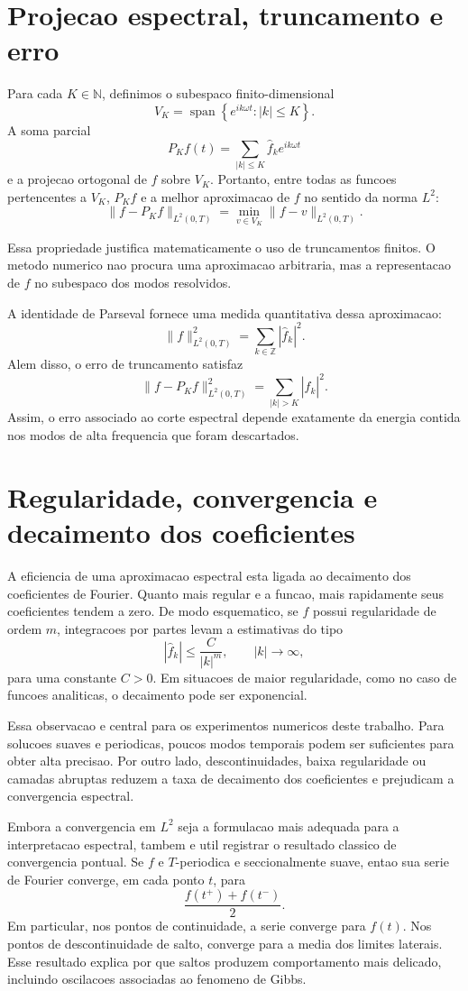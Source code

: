 \section{Projecao espectral, truncamento e erro}

Para cada \(K\in\mathbb{N}\), definimos o subespaco finito-dimensional
\[
V_K=
\operatorname{span}
\left\{
e^{ik\omega t}: |k|\le K
\right\}.
\]
A soma parcial
\[
P_Kf(t)=
\sum_{|k|\le K}\widehat f_k e^{ik\omega t}
\]
e a projecao ortogonal de \(f\) sobre \(V_K\). Portanto, entre todas as funcoes
pertencentes a \(V_K\), \(P_Kf\) e a melhor aproximacao de \(f\) no sentido da
norma \(L^2\):
\[
\|f-P_Kf\|_{L^2(0,T)}
=
\min_{v\in V_K}\|f-v\|_{L^2(0,T)}.
\]

Essa propriedade justifica matematicamente o uso de truncamentos finitos. O
metodo numerico nao procura uma aproximacao arbitraria, mas a representacao de
\(f\) no subespaco dos modos resolvidos.

A identidade de Parseval fornece uma medida quantitativa dessa aproximacao:
\[
\|f\|_{L^2(0,T)}^2
=
\sum_{k\in\mathbb{Z}}|\widehat f_k|^2.
\]
Alem disso, o erro de truncamento satisfaz
\[
\|f-P_Kf\|_{L^2(0,T)}^2
=
\sum_{|k|>K}|\widehat f_k|^2.
\]
Assim, o erro associado ao corte espectral depende exatamente da energia
contida nos modos de alta frequencia que foram descartados.

\section{Regularidade, convergencia e decaimento dos coeficientes}

A eficiencia de uma aproximacao espectral esta ligada ao decaimento dos
coeficientes de Fourier. Quanto mais regular e a funcao, mais rapidamente seus
coeficientes tendem a zero. De modo esquematico, se \(f\) possui regularidade de
ordem \(m\), integracoes por partes levam a estimativas do tipo
\[
|\widehat f_k|\le \frac{C}{|k|^m},
\qquad |k|\to\infty,
\]
para uma constante \(C>0\). Em situacoes de maior regularidade, como no caso de
funcoes analiticas, o decaimento pode ser exponencial.

Essa observacao e central para os experimentos numericos deste trabalho. Para
solucoes suaves e periodicas, poucos modos temporais podem ser suficientes para
obter alta precisao. Por outro lado, descontinuidades, baixa regularidade ou
camadas abruptas reduzem a taxa de decaimento dos coeficientes e prejudicam a
convergencia espectral.

Embora a convergencia em \(L^2\) seja a formulacao mais adequada para a
interpretacao espectral, tambem e util registrar o resultado classico de
convergencia pontual. Se \(f\) e \(T\)-periodica e seccionalmente suave, entao
sua serie de Fourier converge, em cada ponto \(t\), para
\[
\frac{f(t^+)+f(t^-)}{2}.
\]
Em particular, nos pontos de continuidade, a serie converge para \(f(t)\). Nos
pontos de descontinuidade de salto, converge para a media dos limites laterais.
Esse resultado explica por que saltos produzem comportamento mais delicado,
incluindo oscilacoes associadas ao fenomeno de Gibbs.

